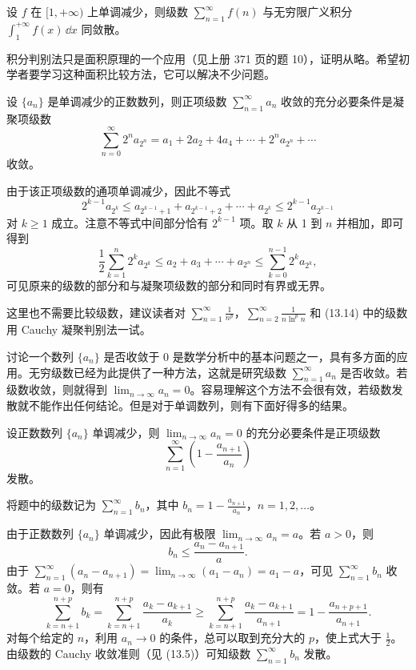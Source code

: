 \begin{xproposition}
设 $f$ 在 $[1,+\infty)$ 上单调减少，则级数 $\sum_{n=1}^{\infty}f(n)$ 与无穷限广义积分 $\int_1^{+\infty}f(x)\,\dd x$ 同敛散。
\end{xproposition}

\begin{xremark}
积分判别法只是面积原理的一个应用（见上册 371 页的题 10），证明从略。希望初学者要学习这种面积比较方法，它可以解决不少问题。
\end{xremark}

\begin{xproposition}
设 $\{a_n\}$ 是单调减少的正数数列，则正项级数 $\sum_{n=1}^{\infty}a_n$ 收敛的充分必要条件是凝聚项级数
\[
\sum_{n=0}^{\infty}2^na_{2^n}=a_1+2a_2+4a_4+\cdots+2^na_{2^n}+\cdots
\]
收敛。
\end{xproposition}
\begin{xproof}
由于该正项级数的通项单调减少，因此不等式
\[
2^{k-1}a_{2^k}\leq a_{2^{k-1}+1}+a_{2^{k-1}+2}+\cdots+a_{2^k}\leq2^{k-1}a_{2^{k-1}}
\]
对 $k\geq1$ 成立。注意不等式中间部分恰有 $2^{k-1}$ 项。取 $k$ 从 1 到 $n$ 并相加，即可得到
\[
\frac12\sum_{k=1}^{n}2^ka_{2^k}\leq a_2+a_3+\cdots+a_{2^n}\leq\sum_{k=0}^{n-1}2^ka_{2^k},
\]
可见原来的级数的部分和与凝聚项级数的部分和同时有界或无界。
\end{xproof}

\begin{xremark}
这里也不需要比较级数，建议读者对 $\sum_{n=1}^{\infty}\frac1{n^p}$，$\sum_{n=2}^{\infty}\frac1{n\ln^p n}$ 和 (13.14) 中的级数用 Cauchy 凝聚判别法一试。
\end{xremark}

讨论一个数列 $\{a_n\}$ 是否收敛于 0 是数学分析中的基本问题之一，具有多方面的应用。无穷级数已经为此提供了一种方法，这就是研究级数 $\sum_{n=1}^{\infty}a_n$ 是否收敛。若级数收敛，则就得到 $\lim_{n\to\infty}a_n=0$。容易理解这个方法不会很有效，若级数发散就不能作出任何结论。但是对于单调数列，则有下面好得多的结果。

\begin{xproposition}
设正数数列 $\{a_n\}$ 单调减少，则 $\lim_{n\to\infty}a_n=0$ 的充分必要条件是正项级数
\[
\sum_{n=1}^{\infty}\left(1-\frac{a_{n+1}}{a_n}\right)
\]
发散。
\end{xproposition}
\begin{xproof}
将题中的级数记为 $\sum_{n=1}^{\infty}b_n$，其中 $b_n=1-\frac{a_{n+1}}{a_n}$，$n=1,2,\ldots$。

由于正数数列 $\{a_n\}$ 单调减少，因此有极限 $\lim_{n\to\infty}a_n=a$。若 $a>0$，则
\[
b_n\leq\frac{a_n-a_{n+1}}a.
\]
由于 $\sum_{n=1}^{\infty}(a_n-a_{n+1})=\lim_{n\to\infty}(a_1-a_n)=a_1-a$，可见 $\sum_{n=1}^{\infty}b_n$ 收敛。若 $a=0$，则有
\[
\sum_{k=n+1}^{n+p}b_k=\sum_{k=n+1}^{n+p}\frac{a_k-a_{k+1}}{a_k}\geq\sum_{k=n+1}^{n+p}\frac{a_k-a_{k+1}}{a_{n+1}}=1-\frac{a_{n+p+1}}{a_{n+1}}.
\]
对每个给定的 $n$，利用 $a_n\to0$ 的条件，总可以取到充分大的 $p$，使上式大于 $\frac12$。由级数的 Cauchy 收敛准则（见 (13.5)）可知级数 $\sum_{n=1}^{\infty}b_n$ 发散。
\end{xproof}

